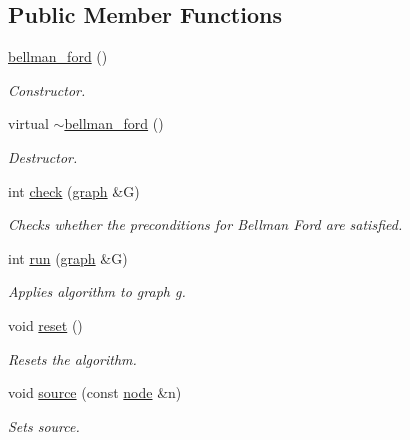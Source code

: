 \subsection*{Public Member Functions}
\begin{DoxyCompactItemize}
\item 
\mbox{\label{classbellman__ford_ae732e7ea1c63e3ed64779b31a3a9a208}} 
\mbox{\hyperlink{classbellman__ford_ae732e7ea1c63e3ed64779b31a3a9a208}{bellman\+\_\+ford}} ()
\begin{DoxyCompactList}\small\item\em Constructor. \end{DoxyCompactList}\item 
\mbox{\label{classbellman__ford_a8461c6b8d7663b05a97b6d270347a49c}} 
virtual \mbox{\hyperlink{classbellman__ford_a8461c6b8d7663b05a97b6d270347a49c}{$\sim$bellman\+\_\+ford}} ()
\begin{DoxyCompactList}\small\item\em Destructor. \end{DoxyCompactList}\item 
int \mbox{\hyperlink{classbellman__ford_a9da2fb7d20ef1f726ee935474302d80b}{check}} (\mbox{\hyperlink{classgraph}{graph}} \&G)
\begin{DoxyCompactList}\small\item\em Checks whether the preconditions for Bellman Ford are satisfied. \end{DoxyCompactList}\item 
int \mbox{\hyperlink{classbellman__ford_a226308389f3c36dfc02768c09f777a3b}{run}} (\mbox{\hyperlink{classgraph}{graph}} \&G)
\begin{DoxyCompactList}\small\item\em Applies algorithm to graph g. \end{DoxyCompactList}\item 
void \mbox{\hyperlink{classbellman__ford_a7d28afa62ce8068c4d0f2d1f96136fd6}{reset}} ()
\begin{DoxyCompactList}\small\item\em Resets the algorithm. \end{DoxyCompactList}\item 
void \mbox{\hyperlink{classbellman__ford_a98cad540fd2d211c1ba44bb6fa8416f3}{source}} (const \mbox{\hyperlink{classnode}{node}} \&n)
\begin{DoxyCompactList}\small\item\em Sets source. \end{DoxyCompactList}\item 

\end{DoxyCompactItemize}
